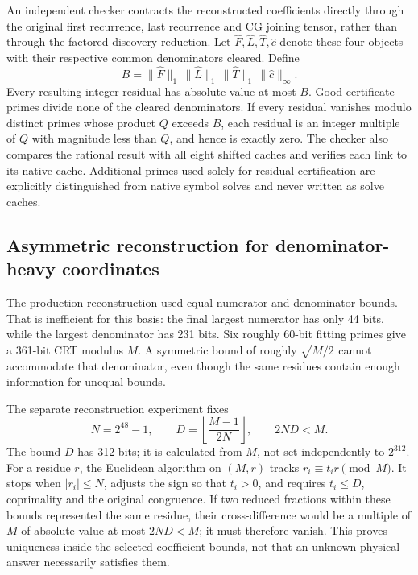 \documentclass[11pt]{article}
\begin{document}
An independent checker contracts the reconstructed coefficients directly
through the original first recurrence, last recurrence and CG joining
tensor, rather than through the factored discovery reduction. Let
$\widehat F,\widehat L,\widehat T,\widehat c$ denote these four objects with
their respective common denominators cleared. Define
\begin{equation}
 B=\|\widehat F\|_1\,\|\widehat L\|_1\,
   \|\widehat T\|_1\,\|\widehat c\|_\infty.
\end{equation}
Every resulting integer residual has absolute value at most $B$. Good
certificate primes divide none of the cleared denominators. If every
residual vanishes modulo distinct primes whose product $Q$ exceeds $B$,
each residual is an integer multiple of $Q$ with magnitude less than $Q$,
and hence is exactly zero. The checker also compares the rational result
with all eight shifted caches and verifies each link to its native cache. Additional primes used solely for
residual certification are explicitly distinguished from native symbol
solves and never written as solve caches.

\subsection{Asymmetric reconstruction for denominator-heavy coordinates}
The production reconstruction used equal numerator and denominator bounds.
That is inefficient for this basis: the final largest numerator has only
44 bits, while the largest denominator has 231 bits. Six roughly 60-bit
fitting primes give a 361-bit CRT modulus $M$. A symmetric bound of roughly
$\sqrt{M/2}$ cannot accommodate that denominator, even though the same
residues contain enough information for unequal bounds.

The separate reconstruction experiment fixes
\[
 N=2^{48}-1,\qquad D=\left\lfloor\frac{M-1}{2N}\right\rfloor,
 \qquad 2ND<M.
\]
The bound $D$ has 312 bits; it is calculated from $M$, not set independently
to $2^{312}$. For a residue $r$, the Euclidean algorithm on $(M,r)$ tracks
$r_i\equiv t_i r\pmod M$. It stops when $|r_i|\leq N$, adjusts the sign so
that $t_i>0$, and requires $t_i\leq D$, coprimality and the original
congruence. If two reduced fractions within these bounds represented the
same residue, their cross-difference would be a multiple of $M$ of absolute
value at most $2ND<M$; it must therefore vanish. This proves uniqueness
inside the selected coefficient bounds, not that an unknown physical
answer necessarily satisfies them.
\end{document}
